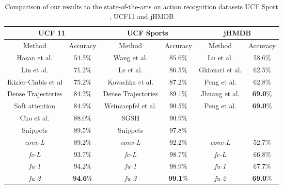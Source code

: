 \documentclass[10pt,twocolumn,letterpaper]{article}
\begin{document}
\begin{table*}
\begin{center}
\begin{tabular}{|c|c||c|c||c|c|}
 \hline
	
      \multicolumn{2}{|c||}{UCF 11} &
      \multicolumn{2}{c||}{UCF Sports} &
      \multicolumn{2}{c|}{jHMDB} \\
  \hline  
  
       Method & Accuracy & Method & Accuracy & Method & Accuracy  \\
  \hline
	Hasan et al. \cite{Hasan2014} & 54.5\% & Wang et al. \cite{Wang2009} & 85.6\% &  Lu et al. \cite{Lu2015} & 58.6\%  \\	
	Liu et al. \cite{UCF11wild}& 71.2\% & Le et al. \cite{Le2011} & 86.5\% &  Gkioxari et al.\cite{actiontubes}  & 62.5\%\\	
	Ikizler-Cinbis et al \cite{Ikizler-Cinbis2010} & 75.2\% & Kovashka et al. \cite{Kovashka2010} & 87.2\% &  Peng et al. \cite{peng2014}  & 62.8\% \\
	Dense Trajectories \cite{densetrajectories} & 84.2\% & Dense Trajectories  \cite{densetrajectories} & 89.1\% & Jhuang et al. \cite{jHMDB2013} & \textbf{69.0}\% \\
	Soft attention \cite{Sharma2015} &84.9\%  & Weinzaepfel et al. \cite{weinzaepfel2015}& 90.5\% &  Peng et al. \cite{PengX2014}  & \textbf{69.0}\% \\
	Cho et al.\cite{Cho2014} & 88.0\%  & SGSH \cite{Abdulmunem2016}& 90.9\% &  &   \\	
	 Snippets \cite{Ravanbakhsh15} & 89.5\% & Snippets \cite{Ravanbakhsh15} & 97.8\% &   &   \\
\hline
\hline
       \textit{conv-L}  & 89.2\% & \textit{conv-L} & 92.2\%  & \textit{conv-L} & 52.7\%\\	
       \textit{fc-L}  & 93.7\% & \textit{fc-L} & 98.7\%  & \textit{fc-L} & 66.8\%\\	
       \textit{fu-1}  & 94.2\% & \textit{fu-1} & 98.9\%  & \textit{fu-1} & 67.7\%\\	
       \textit{fu-2}  & \textbf{94.6}\% & \textit{fu-2} & \textbf{99.1}\%  & \textit{fu-2} & \textbf{69.0}\%\\	
		

\hline			
			
\end{tabular} %
\end{center}
\vspace{-3 mm}
\caption{Comparison of our results to the state-of-the-arts on action recognition datasets UCF Sport , UCF11 and jHMDB }\label{tab:tab_1}
\end{table*}
\end{document}
